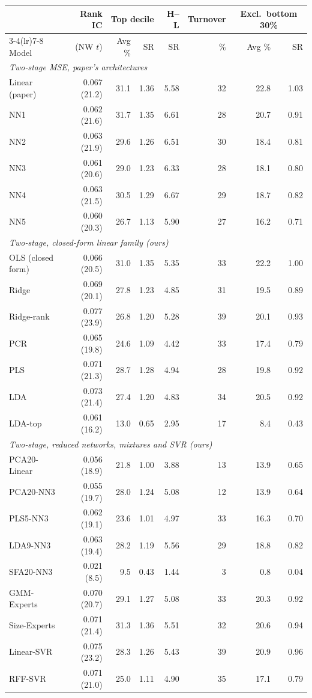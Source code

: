\begin{tabular}{lrrrrrrr}
\toprule
 & Rank IC & \multicolumn{2}{c}{Top decile} & H--L & Turnover & \multicolumn{2}{c}{Excl.\ bottom 30\%} \\
\cmidrule(lr){3-4}\cmidrule(lr){7-8}
Model & (NW $t$) & Avg \% & SR & SR & \% & Avg \% & SR \\
\midrule
\multicolumn{8}{l}{\emph{Two-stage MSE, paper's architectures}} \\
Linear (paper) & 0.067 (21.2) & 31.1 & 1.36 & 5.58 & 32 & 22.8 & 1.03 \\
NN1 & 0.062 (21.6) & 31.7 & 1.35 & 6.61 & 28 & 20.7 & 0.91 \\
NN2 & 0.063 (21.9) & 29.6 & 1.26 & 6.51 & 30 & 18.4 & 0.81 \\
NN3 & 0.061 (20.6) & 29.0 & 1.23 & 6.33 & 28 & 18.1 & 0.80 \\
NN4 & 0.063 (21.5) & 30.5 & 1.29 & 6.67 & 29 & 18.7 & 0.82 \\
NN5 & 0.060 (20.3) & 26.7 & 1.13 & 5.90 & 27 & 16.2 & 0.71 \\
\multicolumn{8}{l}{\emph{Two-stage, closed-form linear family (ours)}} \\
OLS (closed form) & 0.066 (20.5) & 31.0 & 1.35 & 5.35 & 33 & 22.2 & 1.00 \\
Ridge & 0.069 (20.1) & 27.8 & 1.23 & 4.85 & 31 & 19.5 & 0.89 \\
Ridge-rank & 0.077 (23.9) & 26.8 & 1.20 & 5.28 & 39 & 20.1 & 0.93 \\
PCR & 0.065 (19.8) & 24.6 & 1.09 & 4.42 & 33 & 17.4 & 0.79 \\
PLS & 0.071 (21.3) & 28.7 & 1.28 & 4.94 & 28 & 19.8 & 0.92 \\
LDA & 0.073 (21.4) & 27.4 & 1.20 & 4.83 & 34 & 20.5 & 0.92 \\
LDA-top & 0.061 (16.2) & 13.0 & 0.65 & 2.95 & 17 & 8.4 & 0.43 \\
\multicolumn{8}{l}{\emph{Two-stage, reduced networks, mixtures and SVR (ours)}} \\
PCA20-Linear & 0.056 (18.9) & 21.8 & 1.00 & 3.88 & 13 & 13.9 & 0.65 \\
PCA20-NN3 & 0.055 (19.7) & 28.0 & 1.24 & 5.08 & 12 & 13.9 & 0.64 \\
PLS5-NN3 & 0.062 (19.1) & 23.6 & 1.01 & 4.97 & 33 & 16.3 & 0.70 \\
LDA9-NN3 & 0.063 (19.4) & 28.2 & 1.19 & 5.56 & 29 & 18.8 & 0.82 \\
SFA20-NN3 & 0.021 (8.5) & 9.5 & 0.43 & 1.44 & 3 & 0.8 & 0.04 \\
GMM-Experts & 0.070 (20.7) & 29.1 & 1.27 & 5.08 & 33 & 20.3 & 0.92 \\
Size-Experts & 0.071 (21.4) & 31.3 & 1.36 & 5.51 & 32 & 20.6 & 0.94 \\
Linear-SVR & 0.075 (23.2) & 28.3 & 1.26 & 5.43 & 39 & 20.9 & 0.96 \\
RFF-SVR & 0.071 (21.0) & 25.0 & 1.11 & 4.90 & 35 & 17.1 & 0.79 \\
\bottomrule
\end{tabular}
